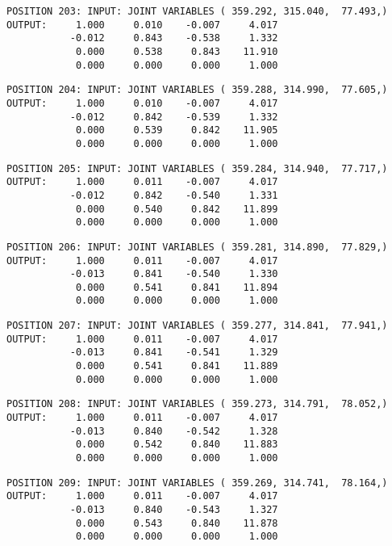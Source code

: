 \begin{verbatim}
POSITION 203: INPUT: JOINT VARIABLES ( 359.292, 315.040,  77.493,)
OUTPUT:     1.000     0.010    -0.007     4.017
           -0.012     0.843    -0.538     1.332
            0.000     0.538     0.843    11.910
            0.000     0.000     0.000     1.000
\end{verbatim} \pagebreak[1]\begin{verbatim}
POSITION 204: INPUT: JOINT VARIABLES ( 359.288, 314.990,  77.605,)
OUTPUT:     1.000     0.010    -0.007     4.017
           -0.012     0.842    -0.539     1.332
            0.000     0.539     0.842    11.905
            0.000     0.000     0.000     1.000
\end{verbatim} \pagebreak[1]\begin{verbatim}
POSITION 205: INPUT: JOINT VARIABLES ( 359.284, 314.940,  77.717,)
OUTPUT:     1.000     0.011    -0.007     4.017
           -0.012     0.842    -0.540     1.331
            0.000     0.540     0.842    11.899
            0.000     0.000     0.000     1.000
\end{verbatim} \pagebreak[1]\begin{verbatim}
POSITION 206: INPUT: JOINT VARIABLES ( 359.281, 314.890,  77.829,)
OUTPUT:     1.000     0.011    -0.007     4.017
           -0.013     0.841    -0.540     1.330
            0.000     0.541     0.841    11.894
            0.000     0.000     0.000     1.000
\end{verbatim} \pagebreak[1]\begin{verbatim}
POSITION 207: INPUT: JOINT VARIABLES ( 359.277, 314.841,  77.941,)
OUTPUT:     1.000     0.011    -0.007     4.017
           -0.013     0.841    -0.541     1.329
            0.000     0.541     0.841    11.889
            0.000     0.000     0.000     1.000
\end{verbatim} \pagebreak[1]\begin{verbatim}
POSITION 208: INPUT: JOINT VARIABLES ( 359.273, 314.791,  78.052,)
OUTPUT:     1.000     0.011    -0.007     4.017
           -0.013     0.840    -0.542     1.328
            0.000     0.542     0.840    11.883
            0.000     0.000     0.000     1.000
\end{verbatim} \pagebreak[1]\begin{verbatim}
POSITION 209: INPUT: JOINT VARIABLES ( 359.269, 314.741,  78.164,)
OUTPUT:     1.000     0.011    -0.007     4.017
           -0.013     0.840    -0.543     1.327
            0.000     0.543     0.840    11.878
            0.000     0.000     0.000     1.000
\end{verbatim} \pagebreak[1]\begin{verbatim}

\end{verbatim}
